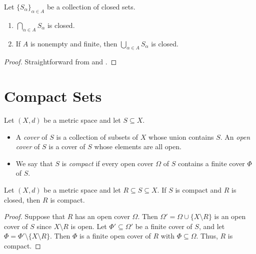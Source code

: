 \begin{corollary}
  Let $\{S_\alpha\}_{\alpha \in A}$ be a collection of closed sets.
  \begin{enumerate}
    \item $\bigcap_{\alpha \in A} S_\alpha$ is closed.
    \item If $A$ is nonempty and finite, then $\bigcup_{\alpha \in A} S_\alpha$
    is closed.
  \end{enumerate}
\end{corollary}
\begin{proof}
  Straightforward from  and .
\end{proof}

\section{Compact Sets}
\begin{definition}
  Let $(X, d)$ be a metric space and let $S \subseteq X$.
  \begin{itemize}
    \item A \emph{cover} of $S$ is a collection of subsets of $X$ whose union
    contains $S$.
    An \emph{open cover} of $S$ is a cover of $S$ whose elements are all open.
    \item We say that $S$ is \emph{compact} if every open cover $\Omega$ of $S$
    contains a finite cover $\Phi$ of $S$.
  \end{itemize}
\end{definition}

\begin{theorem}
  Let $(X, d)$ be a metric space and let $R \subseteq S \subseteq X$.
  If $S$ is compact and $R$ is closed, then $R$ is compact.
\end{theorem}
\begin{proof}
  Suppose that $R$ has an open cover $\Omega$.
  Then $\Omega' = \Omega \cup \{X \setminus R\}$ is an open cover of $S$ since
  $X \setminus R$ is open.
  Let $\Phi' \subseteq \Omega'$ be a finite cover of $S$, and let
  $\Phi = \Phi' \setminus \{X \setminus R\}$.
  Then $\Phi$ is a finite open cover of $R$ with $\Phi \subseteq \Omega$.
  Thus, $R$ is compact.
\end{proof}

